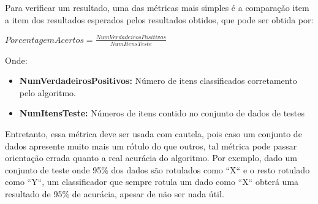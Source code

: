 Para verificar um resultado, uma das métricas mais simples é a comparação item a
item dos resultados esperados pelos resultados obtidos, que pode ser obtida por:

$PorcentagemAcertos = \frac{NumVerdadeirosPositivos}{NumItensTeste}$

Onde:

\begin{itemize}
    \item \textbf{NumVerdadeirosPositivos:} Número de itens classificados
        corretamento pelo algoritmo.
    \item \textbf{NumItensTeste:} Números de itens contido no conjunto de dados de testes
\end{itemize}

Entretanto, essa métrica deve ser usada com cautela, pois caso um conjunto de
dados apresente muito mais um rótulo do que outros, tal métrica pode passar
orientação errada quanto a real acurácia do algoritmo. Por exemplo, dado um
conjunto de teste onde 95\% dos dados são rotulados como ``X`` e o resto rotulado
como ``Y``, um classificador que sempre rotula um dado como ``X`` obterá uma
resultado de 95\% de acurácia, apesar de não ser nada útil.
